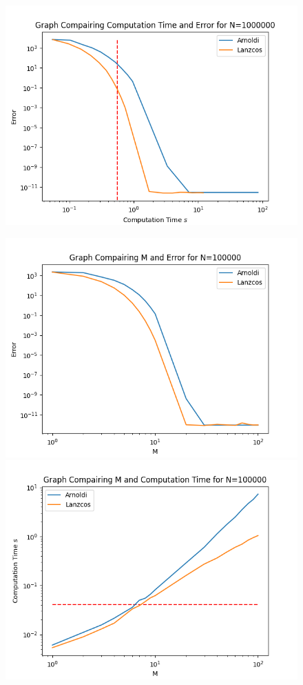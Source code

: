 \documentclass{article}
\begin{document}
\begin{figure}
\begin{minipage}{0.5\textwidth}
	  \label{fig:MEe7}
       \centering
	  \includegraphics[width=\linewidth]{Plots/Comp Time v E Results for N=1000000.png}
	  \label{fig:MEe7}
    \end{minipage}\hfill
    \begin{minipage}{0.5\textwidth}
       \centering
	  \includegraphics[width=\linewidth]{Plots/M v E Results for N=100000.png}
	  \label{fig:MEe6}
       \centering
	  \includegraphics[width=\linewidth]{Plots/M v Comp Time Results for N=100000.png}

\end{minipage}
\end{figure}
\end{document}
